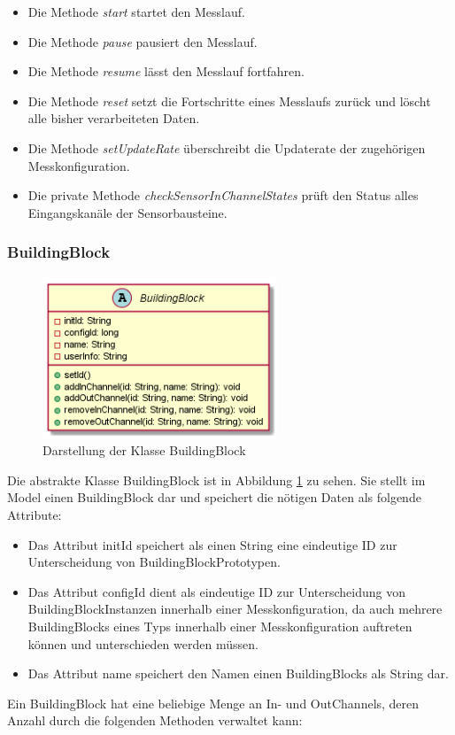 \documentclass[parskip=full]{scrartcl}
\begin{document}
\begin{itemize}

\item Die Methode \textit{start} startet den Messlauf.
\item Die Methode \textit{pause} pausiert den Messlauf.
\item Die Methode \textit{resume} lässt den Messlauf fortfahren.
\item Die Methode \textit{reset} setzt die Fortschritte eines Messlaufs zurück und löscht alle bisher verarbeiteten Daten.
\item Die Methode \textit{setUpdateRate} überschreibt die Updaterate der zugehörigen Messkonfiguration. 
\item Die private Methode \textit{checkSensorInChannelStates} prüft den Status alles Eingangskanäle der Sensorbausteine. 

\end{itemize}


\subsubsection{BuildingBlock}
\begin{figure}[htbp]
	\begin{center}
		\includegraphics[width = 7cm]{Grafiken/BuildingBlock.png}
		\caption{Darstellung der Klasse BuildingBlock}
		\label{BuildingBlock}
	\end{center}
\end{figure}

Die abstrakte Klasse BuildingBlock ist in Abbildung \ref{BuildingBlock} zu sehen. Sie stellt im Model einen BuildingBlock dar und speichert die nötigen Daten als folgende Attribute:
\begin{itemize}

\item Das Attribut initId speichert als einen String eine eindeutige ID zur Unterscheidung von BuildingBlockPrototypen.
\item Das Attribut configId dient als eindeutige ID zur Unterscheidung von BuildingBlockInstanzen innerhalb einer Messkonfiguration, da auch mehrere BuildingBlocks eines Typs innerhalb einer Messkonfiguration auftreten können und unterschieden werden müssen.
\item Das Attribut name speichert den Namen einen BuildingBlocks als String dar. 
\end{itemize}
Ein BuildingBlock hat eine beliebige Menge an In- und OutChannels, deren Anzahl durch die folgenden Methoden verwaltet kann:
\end{document}
